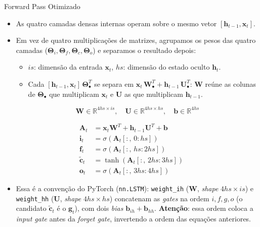 \documentclass[aspectratio=169,xcolor=dvipsnames]{beamer}
\begin{document}
\begin{frame}{Forward Pass Otimizado}
\begin{itemize}\small
    \item As quatro camadas densas internas operam sobre o mesmo vetor $[\mathbf{h}_{t-1}, \mathbf{x}_t]$.
    \item Em vez de quatro multiplicações de matrizes, agrupamos os pesos das quatro camadas ($\mathbf{\Theta}_i, \mathbf{\Theta}_f, \mathbf{\Theta}_c, \mathbf{\Theta}_o$) e separamos o resultado depois:
    \begin{itemize}
        \item $is$: dimensão da entrada $\mathbf{x}_t$, \quad $hs$: dimensão do estado oculto $\mathbf{h}_t$.
        \item Cada $[\mathbf{h}_{t-1}, \mathbf{x}_t]\,\mathbf{\Theta}_\bullet^{T}$ se separa em $\mathbf{x}_t\,\mathbf{W}_\bullet^{T} + \mathbf{h}_{t-1}\,\mathbf{U}_\bullet^{T}$: $\mathbf{W}$ reúne as colunas de $\mathbf{\Theta}_\bullet$ que multiplicam $\mathbf{x}_t$ e $\mathbf{U}$ as que multiplicam $\mathbf{h}_{t-1}$.
    \end{itemize}
    \[
        \mathbf{W} \in \mathbb{R}^{4hs \times is}, \quad \mathbf{U} \in \mathbb{R}^{4hs \times hs}, \quad \mathbf{b} \in \mathbb{R}^{4hs}
    \]
\end{itemize}
{\small
\begin{align*}
    \mathbf{A}_t &= \mathbf{x}_t \mathbf{W}^{T} + \mathbf{h}_{t-1} \mathbf{U}^{T} + \mathbf{b} \\
    \mathbf{i}_t &= \sigma(\mathbf{A}_t[:,\,0:hs]) \\
    \mathbf{f}_t &= \sigma(\mathbf{A}_t[:,\,hs:2hs]) \\
    \tilde{\mathbf{c}}_t &= \tanh(\mathbf{A}_t[:,\,2hs:3hs]) \\
    \mathbf{o}_t &= \sigma(\mathbf{A}_t[:,\,3hs:4hs])
\end{align*}}
\begin{itemize}\footnotesize
    \item Essa é a convenção do PyTorch (\texttt{nn.LSTM}): \texttt{weight\_ih} ($\mathbf{W}$, \textit{shape} $4hs \times is$) e \texttt{weight\_hh} ($\mathbf{U}$, \textit{shape} $4hs \times hs$) concatenam as \textit{gates} na ordem $i, f, g, o$ (o candidato $\tilde{\mathbf{c}}_t$ é o $\mathbf{g}_t$), com dois \textit{bias} $\mathbf{b}_{ih} + \mathbf{b}_{hh}$. \textbf{Atenção}: essa ordem coloca a \textit{input gate} antes da \textit{forget gate}, invertendo a ordem das equações anteriores.
\end{itemize}
\end{frame}
\end{document}
